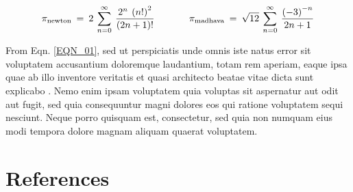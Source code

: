 \documentclass[letterpaper,12pt,fleqn]{article}
\begin{document}
\begin{equation}
  \pi_{\mathrm{newton}} \:=\: 2 \:\sum_{n=0}^{\infty}\:\frac{2^{n}\:\left(n!\right)^{2}}{\left(2n+1\right)!}
  \hspace{0.50in}
  \pi_{\mathrm{madhava}} \:=\: \sqrt{12}\:\sum_{n=0}^{\infty}\:\frac{\left(-3\right)^{-n}}{2n + 1}
  \label{EQN_01}
\end{equation}

From Eqn. \eqref{EQN_01}, sed ut perspiciatis unde omnis 
iste natus error sit voluptatem accusantium doloremque laudantium, totam rem 
aperiam, eaque ipsa quae ab illo inventore veritatis et quasi architecto 
beatae vitae dicta sunt explicabo \cite{GN2006, EPR1935, WC1953}. Nemo enim 
ipsam voluptatem quia voluptas sit aspernatur aut odit aut fugit, sed quia 
consequuntur magni dolores eos qui ratione voluptatem sequi nesciunt. Neque
porro quisquam est, consectetur, sed quia non numquam eius modi tempora 
dolore magnam aliquam quaerat voluptatem.

\vfill
{}
\section*{References}


\vfill
\end{document}
